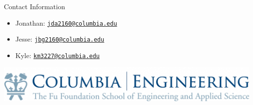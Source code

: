 \documentclass[final]{beamer}
\newlength{\onecolwid}
\begin{document}
\begin{frame}[t]
\begin{columns}[t]
\begin{column}{\onecolwid}

\begin{alertblock}{Contact Information}
\begin{itemize}
\item Jonathan: \href{mailto:jda2160@columbia.edu}{\texttt{jda2160@columbia.edu}}
\item Jesse: \href{mailto:jbg2160@columbia.edu}{\texttt{jbg2160@columbia.edu}}
\item Kyle: \href{mailto:km3227@columbia.edu}{\texttt{km3227@columbia.edu}}
\end{itemize}
\end{alertblock}

\begin{center}
\includegraphics[width=0.8\linewidth]{logo.jpg} %
\end{center}

\end{column} %
\end{columns} %
\end{frame} %
\end{document}
